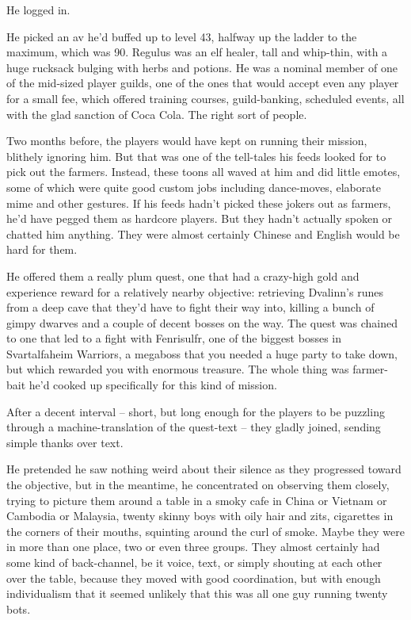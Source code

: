 He logged in.

He picked an av he'd buffed up to level 43, halfway up the ladder
to the maximum, which was 90. Regulus was an elf healer, tall and
whip-thin, with a huge rucksack bulging with herbs and potions. He
was a nominal member of one of the mid-sized player guilds, one of
the ones that would accept even any player for a small fee, which
offered training courses, guild-banking, scheduled events, all with
the glad sanction of Coca Cola. The right sort of people.


Two months before, the players would have kept on running their
mission, blithely ignoring him. But that was one of the tell-tales
his feeds looked for to pick out the farmers. Instead, these toons
all waved at him and did little emotes, some of which were quite
good custom jobs including dance-moves, elaborate mime and other
gestures. If his feeds hadn't picked these jokers out as farmers,
he'd have pegged them as hardcore players. But they hadn't actually
spoken or chatted him anything. They were almost certainly Chinese
and English would be hard for them.


He offered them a really plum quest, one that had a crazy-high gold
and experience reward for a relatively nearby objective: retrieving
Dvalinn's runes from a deep cave that they'd have to fight their
way into, killing a bunch of gimpy dwarves and a couple of decent
bosses on the way. The quest was chained to one that led to a fight
with Fenrisulfr, one of the biggest bosses in Svartalfaheim
Warriors, a megaboss that you needed a huge party to take down, but
which rewarded you with enormous treasure. The whole thing was
farmer-bait he'd cooked up specifically for this kind of mission.

After a decent interval -- short, but long enough for the players
to be puzzling through a machine-translation of the quest-text --
they gladly joined, sending simple thanks over text.

He pretended he saw nothing weird about their silence as they
progressed toward the objective, but in the meantime, he
concentrated on observing them closely, trying to picture them
around a table in a smoky cafe in China or Vietnam or Cambodia or
Malaysia, twenty skinny boys with oily hair and zits, cigarettes in
the corners of their mouths, squinting around the curl of smoke.
Maybe they were in more than one place, two or even three groups.
They almost certainly had some kind of back-channel, be it voice,
text, or simply shouting at each other over the table, because they
moved with good coordination, but with enough individualism that it
seemed unlikely that this was all one guy running twenty bots.

